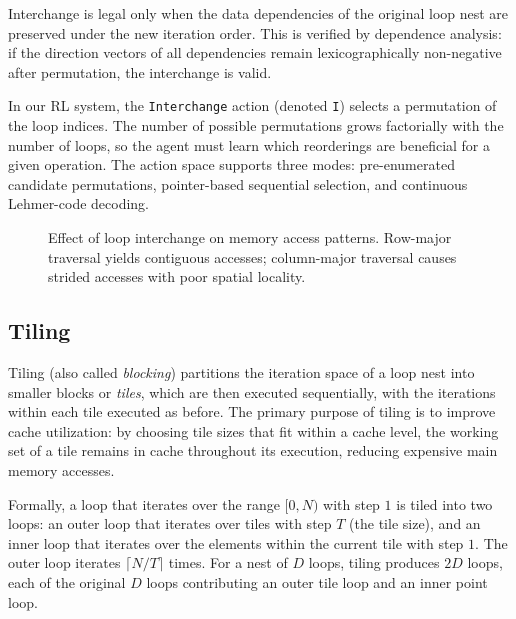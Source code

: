 Interchange is legal only when the data dependencies of the original loop nest are preserved under the new iteration order. This is verified by dependence analysis: if the direction vectors of all dependencies remain lexicographically non-negative after permutation, the interchange is valid.

In our RL system, the \texttt{Interchange} action (denoted \texttt{I}) selects a permutation of the loop indices. The number of possible permutations grows factorially with the number of loops, so the agent must learn which reorderings are beneficial for a given operation. The action space supports three modes: pre-enumerated candidate permutations, pointer-based sequential selection, and continuous Lehmer-code decoding.

\begin{figure}[H]
    \centering
    \caption{Effect of loop interchange on memory access patterns. Row-major traversal yields contiguous accesses; column-major traversal causes strided accesses with poor spatial locality.}
    \label{fig:loop-interchange}
\end{figure}

\subsection{Tiling}

Tiling (also called \textit{blocking}) partitions the iteration space of a loop nest into smaller blocks or \textit{tiles}, which are then executed sequentially, with the iterations within each tile executed as before. The primary purpose of tiling is to improve cache utilization: by choosing tile sizes that fit within a cache level, the working set of a tile remains in cache throughout its execution, reducing expensive main memory accesses.

Formally, a loop that iterates over the range $[0, N)$ with step $1$ is tiled into two loops: an outer loop that iterates over tiles with step $T$ (the tile size), and an inner loop that iterates over the elements within the current tile with step $1$. The outer loop iterates $\lceil N/T \rceil$ times. For a nest of $D$ loops, tiling produces $2D$ loops, each of the original $D$ loops contributing an outer tile loop and an inner point loop.

